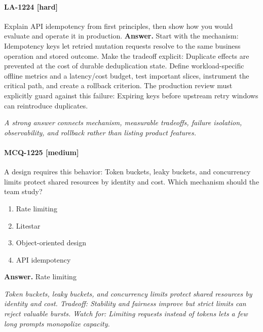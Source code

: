 \paragraph{LA-1224 [hard]} Explain API idempotency from first principles, then show how you would evaluate and operate it in production.
\noindent\textbf{Answer.} Start with the mechanism: Idempotency keys let retried mutation requests resolve to the same business operation and stored outcome. Make the tradeoff explicit: Duplicate effects are prevented at the cost of durable deduplication state. Define workload-specific offline metrics and a latency/cost budget, test important slices, instrument the critical path, and create a rollback criterion. The production review must explicitly guard against this failure: Expiring keys before upstream retry windows can reintroduce duplicates.
\par\textit{A strong answer connects mechanism, measurable tradeoffs, failure isolation, observability, and rollback rather than listing product features.}
\paragraph{MCQ-1225 [medium]} A design requires this behavior: Token buckets, leaky buckets, and concurrency limits protect shared resources by identity and cost. Which mechanism should the team study?
\begin{enumerate}[label=\Alph*.]
\item Rate limiting
\item Litestar
\item Object-oriented design
\item API idempotency
\end{enumerate}
\noindent\textbf{Answer.} Rate limiting
\par\textit{Token buckets, leaky buckets, and concurrency limits protect shared resources by identity and cost. Tradeoff: Stability and fairness improve but strict limits can reject valuable bursts. Watch for: Limiting requests instead of tokens lets a few long prompts monopolize capacity.}
